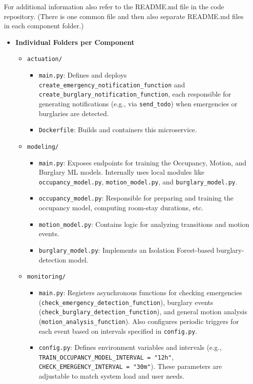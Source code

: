 \documentclass[A4,10pt]{article}
\begin{document}
For additional information also refer to the README.md file in the code repository. (There is one common file and then also separate README.md files in each component folder.)

\begin{itemize}
  \item \textbf{Individual Folders per Component}
  \begin{itemize}
    \item \texttt{actuation/}
      \begin{itemize}
        \item \texttt{main.py}: Defines and deploys \texttt{create\_emergency\_notification\_function}
          and \texttt{create\_burglary\_notification\_function}, each responsible for generating 
          notifications (e.g., via \texttt{send\_todo}) when emergencies or burglaries are detected.
        \item \texttt{Dockerfile}: Builds and containers this microservice.
      \end{itemize}

    \item \texttt{modeling/}
      \begin{itemize}
        \item \texttt{main.py}: Exposes endpoints for training the Occupancy, Motion, 
          and Burglary ML models. Internally uses local modules like \texttt{occupancy\_model.py},
          \texttt{motion\_model.py}, and \texttt{burglary\_model.py}.
        \item \texttt{occupancy\_model.py}: Responsible for preparing and training the occupancy model, 
          computing room-stay durations, etc.
        \item \texttt{motion\_model.py}: Contains logic for analyzing transitions and motion events. 
        \item \texttt{burglary\_model.py}: Implements an Isolation Forest-based burglary-detection model.
      \end{itemize}

    \item \texttt{monitoring/}
      \begin{itemize}
        \item \texttt{main.py}: Registers asynchronous functions for checking emergencies 
          (\texttt{check\_emergency\_detection\_function}), burglary events 
          (\texttt{check\_burglary\_detection\_function}), and general motion analysis 
          (\texttt{motion\_analysis\_function}). Also configures periodic triggers for each event 
          based on intervals specified in \texttt{config.py}.
        \item \texttt{config.py}: Defines environment variables and intervals 
          (e.g., \texttt{TRAIN\_OCCUPANCY\_MODEL\_INTERVAL = "12h"}, 
          \texttt{CHECK\_EMERGENCY\_INTERVAL = "30m"}). These parameters are adjustable 
          to match system load and user needs.
      \end{itemize}
  \end{itemize}


\end{itemize}
\end{document}
